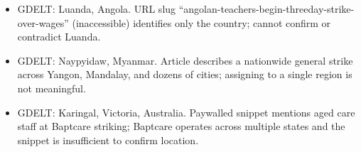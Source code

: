 \documentclass[
  11pt,
]{article}
\providecommand{\tightlist}{%
  \setlength{\itemsep}{0pt}\setlength{\parskip}{0pt}}
\begin{document}
\begin{itemize}
\tightlist
\item
  GDELT: Luanda, Angola. URL slug
  ``angolan-teachers-begin-threeday-strike-over-wages'' (inaccessible)
  identifies only the country; cannot confirm or contradict Luanda.
\item
  GDELT: Naypyidaw, Myanmar. Article describes a nationwide general
  strike across Yangon, Mandalay, and dozens of cities; assigning to a
  single region is not meaningful.
\item
  GDELT: Karingal, Victoria, Australia. Paywalled snippet mentions aged
  care staff at Baptcare striking; Baptcare operates across multiple
  states and the snippet is insufficient to confirm location.
\end{itemize}
\end{document}
